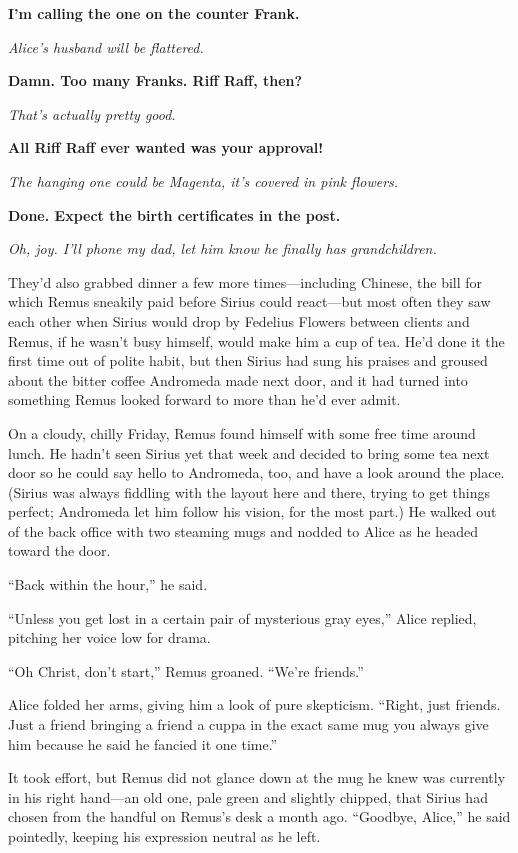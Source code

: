 \textbf{I’m calling the one on the counter Frank.
}

\textit{Alice’s husband will be flattered.
}

\textbf{Damn. Too many Franks. Riff Raff, then?
}

\textit{That’s actually pretty good.
}

\textbf{All Riff Raff ever wanted was your approval!
}

\textit{The hanging one could be Magenta, it’s covered in pink flowers.
}

\textbf{Done. Expect the birth certificates in the post.
}

\textit{Oh, joy. I’ll phone my dad, let him know he finally has grandchildren.
}

They’d also grabbed dinner a few more times—including Chinese, the bill for which Remus sneakily paid before Sirius could react—but most often they saw each other when Sirius would drop by Fedelius Flowers between clients and Remus, if he wasn’t busy himself, would make him a cup of tea. He’d done it the first time out of polite habit, but then Sirius had sung his praises and groused about the bitter coffee Andromeda made next door, and it had turned into something Remus looked forward to more than he’d ever admit.

On a cloudy, chilly Friday, Remus found himself with some free time around lunch. He hadn’t seen Sirius yet that week and decided to bring some tea next door so he could say hello to Andromeda, too, and have a look around the place. (Sirius was always fiddling with the layout here and there, trying to get things perfect; Andromeda let him follow his vision, for the most part.) He walked out of the back office with two steaming mugs and nodded to Alice as he headed toward the door.

“Back within the hour,” he said.

“Unless you get lost in a certain pair of mysterious gray eyes,” Alice replied, pitching her voice low for drama.

“Oh Christ, don’t start,” Remus groaned. “We’re friends.”

Alice folded her arms, giving him a look of pure skepticism. “Right, just friends. Just a friend bringing a friend a cuppa in the exact same mug you always give him because he said he fancied it one time.”

It took effort, but Remus did not glance down at the mug he knew was currently in his right hand—an old one, pale green and slightly chipped, that Sirius had chosen from the handful on Remus’s desk a month ago. “Goodbye, Alice,” he said pointedly, keeping his expression neutral as he left.

